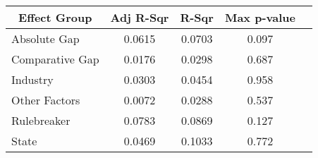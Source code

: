 {
\def\sym#1{\ifmmode^{#1}\else\(^{#1}\)\fi}
    {
        \fontsize{8pt}{7pt}\selectfont
        \tabcolsep=3pt
\begin{tabular}{l*{4}{c}}
    \toprule
    \multicolumn{1}{c}{Effect Group} & \multicolumn{1}{c}{Adj R-Sqr} & \multicolumn{1}{c}{R-Sqr} & \multicolumn{1}{c}{Max p-value} \\
    \midrule
    Absolute Gap                          & 0.0615                        & 0.0703                    & 0.097                           \\
    \addlinespace
    Comparative Gap                     & 0.0176                        & 0.0298                    & 0.687                    \\
    \addlinespace
    Industry                              & 0.0303                        & 0.0454                    & 0.958                           \\
   \addlinespace
    \addlinespace
    Other Factors                       & 0.0072                        & 0.0288                    & 0.537                           \\
    \addlinespace
    Rulebreaker                         & 0.0783                        & 0.0869                    & 0.127                           \\
     \addlinespace
    State                                & 0.0469                        & 0.1033                    & 0.772                           \\
    \bottomrule
\end{tabular}
    }
}

